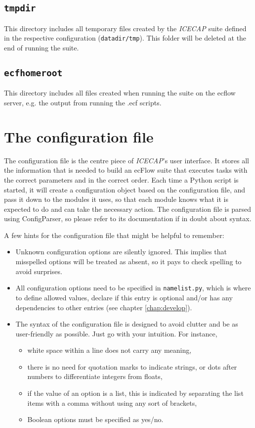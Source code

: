 \documentclass[DIV=10, parskip=full]{scrreprt}
\newcommand{\ice}{\textit{ICECAP}\xspace}
\begin{document}
\section{\texttt{tmpdir}}
This directory includes all temporary files created by the \ice suite defined in the respective configuration (\texttt{datadir/tmp}). This folder will be deleted at the end of running the suite.

\section{\texttt{ecfhomeroot}}
This directory includes all files created when running the suite on the ecflow server, e.g. the output from running the .ecf scripts.





\chapter{The configuration file}\label{chap:config}
The configuration file is the centre piece of {\ice}'s user interface. It stores  all the information that is needed to build an ecFlow suite that executes tasks with the correct parameters and in the correct order. Each time a Python script is started, it will create a configuration object based on the configuration file, and pass it down to the modules it uses, so that each module knows what it is expected to do and can take the necessary action. The configuration file is parsed using ConfigParser, so please refer to its documentation if in doubt about syntax. 

A few hints for the configuration file that might be helpful to remember:
\begin{itemize}
 \item Unknown configuration options are silently ignored. This implies that misspelled options will be treated as absent, so it pays to check spelling to avoid surprises.
 \item All configuration options need to be specified in \texttt{namelist.py}, which is where to define allowed values, declare if this entry is optional and/or has any dependencies to other entries (see chapter \ref{chap:develop}).
 \item The syntax of the configuration file is designed to avoid clutter and be as user-friendly as possible. Just go with your intuition. For instance,
 \begin{itemize}
   \item white space within a line does not carry any meaning,
   \item there is no need for quotation marks to indicate strings, or dots after numbers to differentiate integers from floats,
   \item if the value of an option is a list, this is indicated by separating the list items with a comma without using any sort of brackets,
   \item Boolean options must be specified as yes/no.
 \end{itemize}
\end{itemize}
\end{document}

